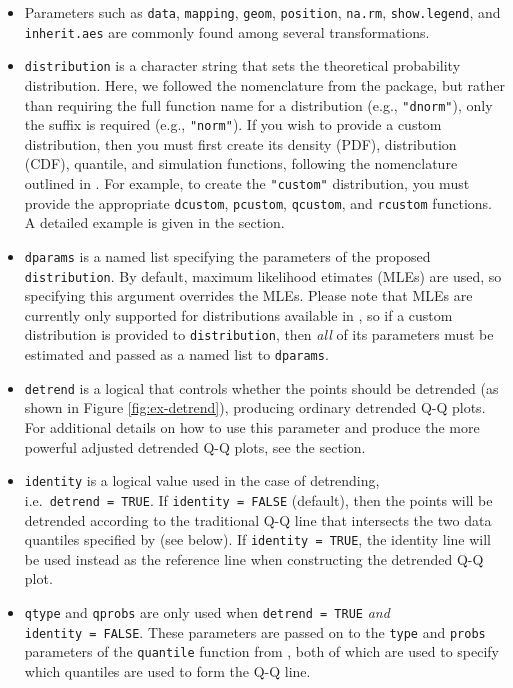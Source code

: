\begin{itemize}
\item
  Parameters such as \texttt{data}, \texttt{mapping}, \texttt{geom},
  \texttt{position}, \texttt{na.rm}, \texttt{show.legend}, and
  \texttt{inherit.aes} are commonly found among several 
  transformations.
\item
  \texttt{distribution} is a character string that sets the theoretical
  probability distribution. Here, we followed the nomenclature from the
   package, but rather than requiring the full function name
  for a distribution (e.g., \texttt{"dnorm"}), only the suffix is
  required (e.g., \texttt{"norm"}). If you wish to provide a custom
  distribution, then you must first create its density (PDF),
  distribution (CDF), quantile, and simulation functions, following the
  nomenclature outlined in . For example, to create the
  \texttt{"custom"} distribution, you must provide the appropriate
  \texttt{dcustom}, \texttt{pcustom}, \texttt{qcustom}, and
  \texttt{rcustom} functions. A detailed example is given in the
   section.
\item
  \texttt{dparams} is a named list specifying the parameters of the
  proposed \texttt{distribution}. By default, maximum likelihood
  etimates (MLEs) are used, so specifying this argument overrides the
  MLEs. Please note that MLEs are currently only supported for
  distributions available in , so if a custom distribution is
  provided to \texttt{distribution}, then \emph{all} of its parameters
  must be estimated and passed as a named list to \texttt{dparams}.
\item
  \texttt{detrend} is a logical that controls whether the points should
  be detrended (as shown in Figure \ref{fig:ex-detrend}), producing
  ordinary detrended Q-Q plots. For additional details on how to use
  this parameter and produce the more powerful adjusted detrended Q-Q
  plots, see the  section.
\item
  \texttt{identity} is a logical value used in the case of detrending,
  i.e.~\texttt{detrend\ =\ TRUE}. If \texttt{identity\ =\ FALSE}
  (default), then the points will be detrended according to the
  traditional Q-Q line that intersects the two data quantiles specified
  by  (see below). If \texttt{identity\ =\ TRUE}, the
  identity line will be used instead as the reference line when
  constructing the detrended Q-Q plot.
\item
  \texttt{qtype} and \texttt{qprobs} are only used when
  \texttt{detrend\ =\ TRUE} \emph{and} \texttt{identity\ =\ FALSE}.
  These parameters are passed on to the \texttt{type} and \texttt{probs}
  parameters of the \texttt{quantile} function from , both of
  which are used to specify which quantiles are used to form the Q-Q
  line.
\end{itemize}

